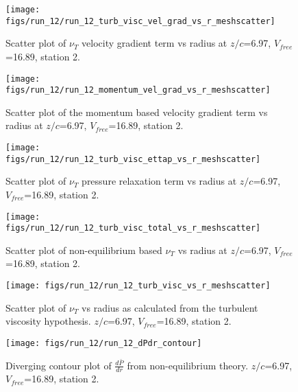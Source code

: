 \begin{figure}[H]
\centering
\texttt{[image: figs/run\_12/run\_12\_turb\_visc\_vel\_grad\_vs\_r\_meshscatter]}
\caption{Scatter plot of $\nu_T$ velocity gradient term vs radius at $z/c$=6.97, $V_{free}$=16.89, station 2.}
\end{figure}


\begin{figure}[H]
\centering
\texttt{[image: figs/run\_12/run\_12\_momentum\_vel\_grad\_vs\_r\_meshscatter]}
\caption{Scatter plot of the momentum based velocity gradient term vs radius at $z/c$=6.97, $V_{free}$=16.89, station 2.}
\end{figure}


\begin{figure}[H]
\centering
\texttt{[image: figs/run\_12/run\_12\_turb\_visc\_ettap\_vs\_r\_meshscatter]}
\caption{Scatter plot of $\nu_T$ pressure relaxation term vs radius at $z/c$=6.97, $V_{free}$=16.89, station 2.}
\end{figure}


\begin{figure}[H]
\centering
\texttt{[image: figs/run\_12/run\_12\_turb\_visc\_total\_vs\_r\_meshscatter]}
\caption{Scatter plot of non-equilibrium based $\nu_T$ vs radius at $z/c$=6.97, $V_{free}$=16.89, station 2.}
\end{figure}


\begin{figure}[H]
\centering
\texttt{[image: figs/run\_12/run\_12\_turb\_visc\_vs\_r\_meshscatter]}
\caption{Scatter plot of $\nu_T$ vs radius as calculated from the turbulent viscosity hypothesis. $z/c$=6.97, $V_{free}$=16.89, station 2.}
\end{figure}


\begin{figure}[H]
\centering
\texttt{[image: figs/run\_12/run\_12\_dPdr\_contour]}
\caption{Diverging contour plot of $\frac{d\bar{P}}{dr}$ from non-equilibrium theory. $z/c$=6.97, $V_{free}$=16.89, station 2.}
\end{figure}


